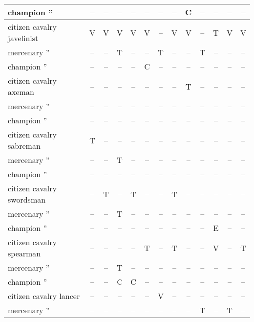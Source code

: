 \documentclass{article}
\begin{document}
\begin{tabular}{l|cccc|cccc|cccc}
champion  ''                          & -- & -- & -- & -- & -- & -- & -- & C  & -- & -- & -- & -- \\
\hline
citizen cavalry javelinist            & V  & V  & V  & V  & V  & -- & V  & V  & -- & T  & V  & V \\
mercenary ''                          & -- & -- & T  & -- & -- & T  & -- & -- & T  & -- & -- & -- \\
champion  ''                          & -- & -- & -- & -- & C  & -- & -- & -- & -- & -- & -- & -- \\
\hline
citizen cavalry axeman                & -- & -- & -- & -- & -- & -- & -- & T  & -- & -- & -- & -- \\
mercenary ''                          & -- & -- & -- & -- & -- & -- & -- & -- & -- & -- & -- & -- \\
champion  ''                          & -- & -- & -- & -- & -- & -- & -- & -- & -- & -- & -- & -- \\
\hline
citizen cavalry sabreman              & T  & -- & -- & -- & -- & -- & -- & -- & -- & -- & -- & -- \\
mercenary ''                          & -- & -- & T  & -- & -- & -- & -- & -- & -- & -- & -- & -- \\
champion  ''                          & -- & -- & -- & -- & -- & -- & -- & -- & -- & -- & -- & -- \\
\hline
citizen cavalry swordsman             & -- & T  & -- & T  & -- & -- & T  & -- & -- & -- & -- & -- \\
mercenary ''                          & -- & -- & T  & -- & -- & -- & -- & -- & -- & -- & -- & -- \\
champion  ''                          & -- & -- & -- & -- & -- & -- & -- & -- & -- & E  & -- & -- \\
\hline
citizen cavalry spearman              & -- & -- & -- & -- & T  & -- & T  & -- & -- & V  & -- & T  \\
mercenary ''                          & -- & -- & T  & -- & -- & -- & -- & -- & -- & -- & -- & -- \\
champion  ''                          & -- & -- & C  & C  & -- & -- & -- & -- & -- & -- & -- & -- \\
\hline
citizen cavalry lancer                & -- & -- & -- & -- & -- & V  & -- & -- & -- & -- & -- & -- \\
mercenary ''                          & -- & -- & -- & -- & -- & -- & -- & -- & T  & -- & T  & -- \\

\end{tabular}
\end{document}
